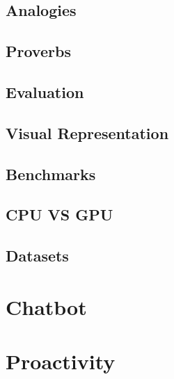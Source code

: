 \subsection{Analogies}
\subsection{Proverbs}
\subsection{Evaluation}
\subsection{Visual Representation}
\subsection{Benchmarks}
\subsection{CPU VS GPU}
\subsection{Datasets}
\section{Chatbot}
\section{Proactivity}